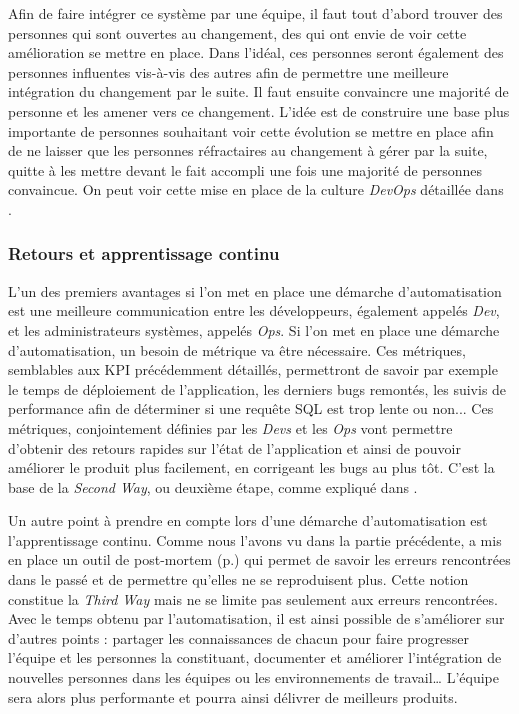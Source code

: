 Afin de faire intégrer ce système par une équipe, il faut tout d'abord trouver des personnes qui sont ouvertes au changement, des  qui ont envie de voir cette amélioration se mettre en place. Dans l'idéal, ces personnes seront également des personnes influentes vis-à-vis des autres afin de permettre une meilleure intégration du changement par le suite. Il faut ensuite convaincre une majorité de personne et les amener vers ce changement. L'idée est de construire une base plus importante de personnes souhaitant voir cette évolution se mettre en place afin de ne laisser que les personnes réfractaires au changement à gérer par la suite, quitte à les mettre devant le fait accompli une fois une majorité de personnes convaincue. On peut voir cette mise en place de la culture \emph{DevOps} détaillée dans  \cite[p.58-59]{devOpsHandbook}.

\subsubsection{Retours et apprentissage continu}

L'un des premiers avantages si l'on met en place une démarche d'automatisation est une meilleure communication entre les développeurs, également appelés \emph{Dev}, et les administrateurs systèmes, appelés \emph{Ops}. Si l'on met en place une démarche d'automatisation, un besoin de métrique va être nécessaire. Ces métriques, semblables aux \gls{KPI} précédemment détaillés, permettront de savoir par exemple le temps de déploiement de l'application, les derniers bugs remontés, les suivis de performance afin de déterminer si une requête \gls{SQL} est trop lente ou non... Ces métriques, conjointement définies par les \emph{Devs} et les \emph{Ops} vont permettre d'obtenir des retours rapides sur l'état de l'application et ainsi de pouvoir améliorer le produit plus facilement, en corrigeant les bugs au plus tôt. C'est la base de la \emph{Second Way}, ou deuxième étape, comme expliqué dans  \cite[p.405-410]{phoenixProject}.

Un autre point à prendre en compte lors d'une démarche d'automatisation est l'apprentissage continu. Comme nous l'avons vu dans la partie précédente, \etsy a mis en place un outil de post-mortem (p.\pageref{post-mortem}) qui permet de savoir les erreurs rencontrées dans le passé et de permettre qu'elles ne se reproduisent plus. Cette notion constitue la \emph{Third Way} mais ne se limite pas seulement aux erreurs rencontrées. Avec le temps obtenu par l'automatisation, il est ainsi possible de s'améliorer sur d'autres points : partager les connaissances de chacun pour faire progresser l'équipe et les personnes la constituant, documenter et améliorer l'intégration de nouvelles personnes dans les équipes ou les environnements de travail\ldots{} L'équipe sera alors plus performante et pourra ainsi délivrer de meilleurs produits.

